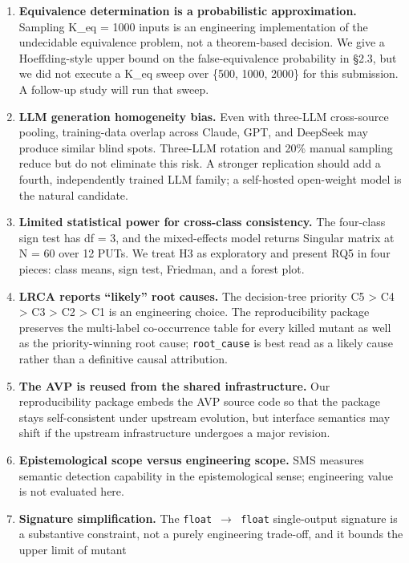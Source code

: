 \documentclass[acmsmall,screen,review]{acmart}
\begin{document}
\begin{enumerate}
\def\labelenumi{(\alph{enumi})}
\item
  \textbf{Equivalence determination is a probabilistic approximation.}
  Sampling K\_eq = 1000 inputs is an engineering implementation of the
  undecidable equivalence problem, not a theorem-based decision. We give
  a Hoeffding-style upper bound on the false-equivalence probability in
  §2.3, but we did not execute a K\_eq sweep over \{500, 1000, 2000\}
  for this submission. A follow-up study will run that sweep.
\item
  \textbf{LLM generation homogeneity bias.} Even with three-LLM
  cross-source pooling, training-data overlap across Claude, GPT, and
  DeepSeek may produce similar blind spots. Three-LLM rotation and 20\%
  manual sampling reduce but do not eliminate this risk. A stronger
  replication should add a fourth, independently trained LLM family; a
  self-hosted open-weight model is the natural candidate.
\item
  \textbf{Limited statistical power for cross-class consistency.} The
  four-class sign test has df = 3, and the mixed-effects model returns
  Singular matrix at N = 60 over 12 PUTs. We treat H3 as exploratory and
  present RQ5 in four pieces: class means, sign test, Friedman, and a
  forest plot.
\item
  \textbf{LRCA reports ``likely'' root causes.} The decision-tree
  priority C5 \textgreater{} C4 \textgreater{} C3 \textgreater{} C2
  \textgreater{} C1 is an engineering choice. The reproducibility
  package preserves the multi-label co-occurrence table for every killed
  mutant as well as the priority-winning root cause; \texttt{root\_cause}
  is best read as a likely cause rather than a definitive causal
  attribution.
\item
  \textbf{The AVP is reused from the shared infrastructure.} Our reproducibility package
  embeds the AVP source code so that the package stays self-consistent under upstream
  evolution, but interface semantics may shift if the upstream infrastructure undergoes a major
  revision.
\item
  \textbf{Epistemological scope versus engineering scope.} SMS measures
  semantic detection capability in the epistemological sense;
  engineering value is not evaluated here.
\item
  \textbf{Signature simplification.} The \texttt{float\ $\to$\ float}
  single-output signature is a substantive constraint, not a purely
  engineering trade-off, and it bounds the upper limit of mutant

\end{enumerate}
\end{document}
